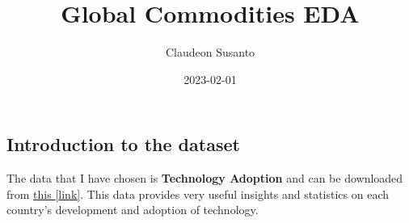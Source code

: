\documentclass[
]{article}
\title{Global Commodities EDA}
\author{Claudeon Susanto}
\date{2023-02-01}
\begin{document}
\maketitle

\hypertarget{introduction-to-the-dataset}{%
\subsection{Introduction to the
dataset}\label{introduction-to-the-dataset}}

The data that I have chosen is \textbf{Technology Adoption} and can be
downloaded from
\href{https://github.com/rfordatascience/tidytuesday/tree/master/data/2022/2022-07-19}{this
{[}link{]}}. This data provides very useful insights and statistics on
each country's development and adoption of technology.
\end{document}
